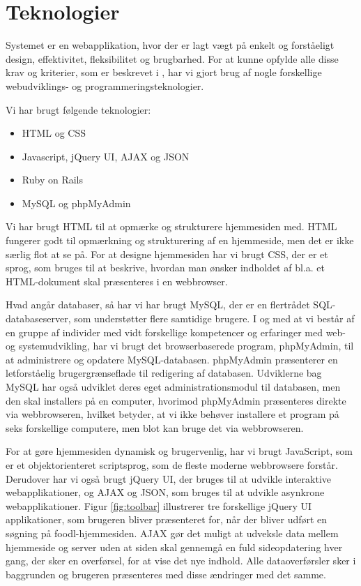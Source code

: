 \section{Teknologier}
\label{sec:teknologier}
Systemet er en webapplikation, hvor der er lagt vægt på enkelt og forståeligt design, effektivitet, fleksibilitet og brugbarhed. For at kunne opfylde alle disse krav og kriterier, som er beskrevet i , har vi gjort brug af nogle forskellige webudviklings- og programmeringsteknologier.

Vi har brugt følgende teknologier:

\begin{itemize}[noitemsep]
\item HTML og CSS
\item Javascript, jQuery UI, AJAX og JSON
\item Ruby on Rails
\item MySQL og phpMyAdmin
\end{itemize}

Vi har brugt HTML\cite{htmlwiki} til at opmærke og strukturere hjemmesiden med. HTML fungerer godt til opmærkning og strukturering af en hjemmeside, men det er ikke særlig flot at se på. For at designe hjemmesiden har vi brugt CSS\cite{csswiki}, der er et sprog, som bruges til at beskrive, hvordan man ønsker indholdet af bl.a. et HTML-dokument skal præsenteres i \fx en webbrowser.

Hvad angår databaser, så har vi har brugt MySQL\cite{mysqlwiki}, der er en flertrådet SQL-databaseserver, som understøtter flere samtidige brugere. I og med at vi består af en gruppe af individer med vidt forskellige kompetencer og erfaringer med web- og systemudvikling, har vi brugt det browserbaserede program, phpMyAdmin\cite{phpmyadminwiki}, til at administrere og opdatere MySQL-databasen. phpMyAdmin præsenterer en letforståelig brugergrænseflade til redigering af databasen. Udviklerne bag MySQL har også udviklet deres eget administrationsmodul til databasen, men den skal installers på en computer, hvorimod phpMyAdmin præsenteres direkte via webbrowseren, hvilket betyder, at vi ikke behøver installere et program på seks forskellige computere, men blot kan bruge det via webbrowseren.

For at gøre hjemmesiden dynamisk og brugervenlig, har vi brugt JavaScript\cite{javascriptwiki}, som er et objektorienteret scriptsprog, som de fleste moderne webbrowsere forstår. Derudover har vi også brugt jQuery UI\cite{jqueryuiwiki}, der bruges til at udvikle interaktive webapplikationer, og AJAX\cite{ajaxwiki} og JSON\cite{jsonwiki}, som bruges til at udvikle asynkrone webapplikationer. Figur \ref{fig:toolbar} illustrerer tre forskellige jQuery UI applikationer, som brugeren bliver præsenteret for, når der bliver udført en søgning på foodl-hjemmesiden. AJAX gør det muligt at udveksle data mellem hjemmeside og server uden at siden skal gennemgå en fuld sideopdatering hver gang, der sker en overførsel, for at vise det nye indhold. Alle dataoverførsler sker i baggrunden og brugeren præsenteres med disse ændringer med det samme.

